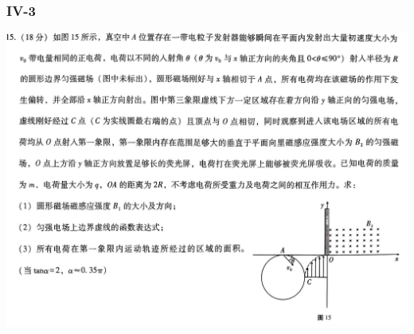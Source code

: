 \documentclass{article}
\begin{document}
    \subsubsection{IV-3}
    \includegraphics[width=50em,keepaspectratio]{./pictures/1.3-6.png}
\end{document}
